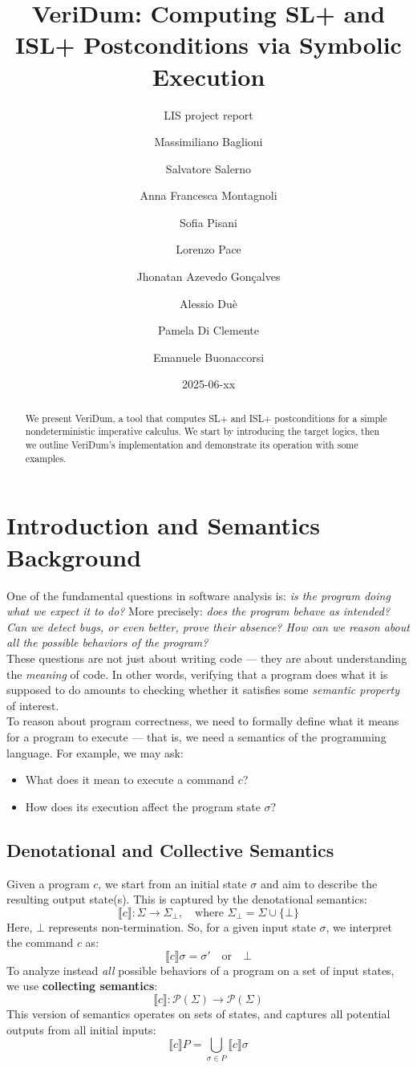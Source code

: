 \documentclass[parskip=half]{scrartcl}
\title{VeriDum: Computing SL+ and ISL+ Postconditions via Symbolic Execution}
\subtitle{LIS project report}
\date{2025-06-xx}
\author{ %
  Massimiliano Baglioni      \and
  Salvatore Salerno          \and
  Anna Francesca Montagnoli  \and
  Sofia Pisani               \and
  Lorenzo Pace               \and
  Jhonatan Azevedo Gonçalves \and
  Alessio Duè                \and
  Pamela Di Clemente         \and
  Emanuele Buonaccorsi}
\begin{document}
\maketitle

\begin{abstract}
  We present VeriDum, a tool that computes SL+ and ISL+ postconditions for a simple nondeterministic imperative calculus. We start by introducing the target logics, then we outline VeriDum's implementation and demonstrate its operation with some examples.
\end{abstract}

\section{Introduction and Semantics Background}

One of the fundamental questions in software analysis is: \emph{is the program doing what we expect it to do?} More precisely: \emph{does the program behave as intended? Can we detect bugs, or even better, prove their absence? How can we reason about all the possible behaviors of the program?}
\\ These questions are not just about writing code — they are about understanding the \emph{meaning} of code. In other words, verifying that a program does what it is supposed to do amounts to checking whether it satisfies some \emph{semantic property} of interest.
\\ To reason about program correctness, we need to formally define what it means for a program to execute — that is, we need a semantics of the programming language. For example, we may ask:
\begin{itemize}
    \item What does it mean to execute a command \( c \)?
    \item How does its execution affect the program state \( \sigma \)?
\end{itemize}

\subsection{Denotational and Collective Semantics}
Given a program \( c \), we start from an initial state \( \sigma \) and aim to describe the resulting output state(s). This is captured by the denotational semantics:
\[
\llbracket c \rrbracket : \Sigma \rightarrow \Sigma_{\bot}, \quad \text{where } \Sigma_{\bot} = \Sigma \cup \{ \bot \}
\]
Here, \( \bot \) represents non-termination. So, for a given input state \( \sigma \), we interpret the command \( c \) as:
\[
\llbracket c \rrbracket \sigma = \sigma' \quad \text{or} \quad \bot
\]
To analyze instead \emph{all} possible behaviors of a program on a set of input states, we use \textbf{collecting semantics}:
\[
\llbracket c \rrbracket : \mathcal{P}(\Sigma) \rightarrow \mathcal{P}(\Sigma)
\]
This version of semantics operates on sets of states, and captures all potential outputs from all initial inputs:
\[
\llbracket c \rrbracket P = \bigcup_{\sigma \in P} \llbracket c \rrbracket \sigma
\]
\end{document}
